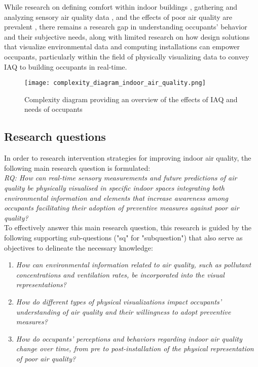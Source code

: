 While research on defining comfort within indoor buildings \cite{alavi_comfort_2017}, gathering and analyzing sensory air quality data \cite{corlan_importance_2021}, and the effects of poor air quality are prevalent \cite{klepeis_national_2001}, there remains a research gap in understanding occupants' behavior and their subjective needs, along with limited research on how design solutions that visualize environmental data and computing installations can empower occupants, particularly within the field of physically visualizing data to convey IAQ to building occupants in real-time. 

\begin{figure}[h]
    \centering
    \texttt{[image: complexity\_diagram\_indoor\_air\_quality.png]}
    \caption{Complexity diagram providing an overview of the effects of IAQ and needs of occupants \cite{schweizer_indoor_2007, wang_how_2021, kim_analyzing_2019, alavi_comfort_2017, corlan_importance_2021, klepeis_national_2001}}
    \label{fig:complexity}
\end{figure}


\subsection{Research questions}

In order to research intervention strategies for improving indoor air quality, the following main research question is formulated: \\

\emph{RQ: How can real-time sensory measurements and future predictions of air quality be physically visualised in specific indoor spaces integrating both environmental information and elements that increase awareness among occupants facilitating their adoption of preventive measures against poor air quality?}\label{rq:1} \\

To effectively answer this main research question, this research is guided by the following supporting sub-questions ("sq" for "subquestion") that also serve as objectives to delineate the necessary knowledge: \\


\begin{enumerate}
    \renewcommand{\labelenumi}{SQ\arabic{enumi}:}
    \item \emph{How can environmental information related to air quality, such as pollutant concentrations and ventilation rates, be incorporated into the visual representations?}\label{subq:1}
    \item \emph{How do different types of physical visualizations impact occupants' understanding of air quality and their willingness to adopt preventive measures?}\label{subq:2}
    \item \emph{How do occupants' perceptions and behaviors regarding indoor air quality change over time, from pre to post-installation of the physical representation of poor air quality?}\label{subq:3}\\
\end{enumerate}